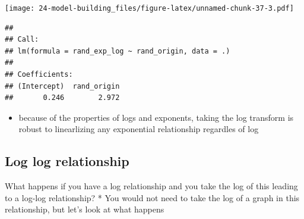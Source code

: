 \documentclass[]{book}
\newenvironment{Shaded}{\begin{snugshade}}{\end{snugshade}}
\newcommand{\CommentTok}[1]{\textcolor[rgb]{0.56,0.35,0.01}{\textit{#1}}}
\newcommand{\DataTypeTok}[1]{\textcolor[rgb]{0.13,0.29,0.53}{#1}}
\newcommand{\KeywordTok}[1]{\textcolor[rgb]{0.13,0.29,0.53}{\textbf{#1}}}
\newcommand{\NormalTok}[1]{#1}
\newcommand{\OperatorTok}[1]{\textcolor[rgb]{0.81,0.36,0.00}{\textbf{#1}}}
\newcommand{\StringTok}[1]{\textcolor[rgb]{0.31,0.60,0.02}{#1}}
\providecommand{\tightlist}{%
  \setlength{\itemsep}{0pt}\setlength{\parskip}{0pt}}
\theoremstyle{definition}
\theoremstyle{definition}
\theoremstyle{definition}
\theoremstyle{remark}
\begin{document}
\texttt{[image: 24-model-building\_files/figure-latex/unnamed-chunk-37-3.pdf]}

\begin{Shaded}
\end{Shaded}

\begin{verbatim}
## 
## Call:
## lm(formula = rand_exp_log ~ rand_origin, data = .)
## 
## Coefficients:
## (Intercept)  rand_origin  
##       0.246        2.972
\end{verbatim}

\begin{itemize}
\tightlist
\item
  because of the properties of logs and exponents, taking the log
  transform is robust to linearlizing any exponential relationship
  regardles of log
\end{itemize}

\hypertarget{log-log-relationship}{%
\subsection{Log log relationship}\label{log-log-relationship}}

What happens if you have a log relationship and you take the log of this
leading to a log-log relationship? * You would not need to take the log
of a graph in this relationship, but let's look at what happens
\end{document}
